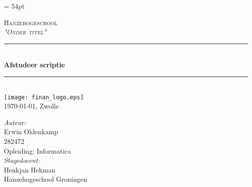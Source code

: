 \documentclass[a4paper,12pt,oneside]{report}
\begin{document}

\pagestyle{fancy}
\renewcommand{\headrulewidth}{0.0pt}
\headheight = 54pt
 







\begin{titlepage}
\oddsidemargin 1cm

\newcommand{\HRule}{\rule{\linewidth}{0.5mm}} %

\center %

\textsc{\LARGE Hanzehogeschool}\\[1.0cm] %

\textsc{\large \textit{"Onder titel"} }\\[0.5cm] %


\HRule \\[0.4cm]
{ \huge \bfseries Afstudeer scriptie}\\[0.4cm] %
\HRule \\[6cm]



\texttt{[image: finan\_logo.eps]}\\
\today, Zwolle
\end{titlepage}

\large
\emph{Auteur:}\\
Erwin Oldenkamp\\
 \textsc{282472} \\
Opleiding: Informatica \\



\emph{Stagedocent:}\\
Henkjan Hekman\\
Hanzehogeschool Groningen \\
\end{document}
